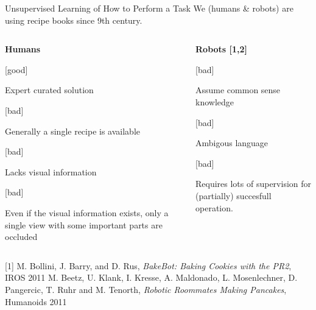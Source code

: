 {
\begin{frame}[c]%
\phantom{title page}
 \titlepage
\end{frame}
\addtocounter{framenumber}{-1}

}


\begin{frame}{Unsupervised Learning of How to Perform a Task}
  We (humans \& robots) are using recipe books since 9th century.
\begin{columns}
  \begin{column}[T]{5.5cm}
    \centering
    {\bf Humans}
    \begin{itemize}
      	{[good]
        \item Expert curated solution}
        {[bad]
        \item Generally a single recipe is available}
        {[bad]
        \item Lacks visual information}
        {[bad]
        \item Even if the visual information exists, only a single view with some important parts are occluded}
    \end{itemize}
  \end{column}
  \begin{column}[T]{5.5cm}
    \centering
    {\bf Robots [1,2]}
    \begin{itemize}
{[bad]
\item Assume common sense knowledge}
{[bad]
\item Ambigous language}
{[bad]
\item Requires lots of supervision for (partially) succesfull operation.}
    \end{itemize}
  \end{column}

\end{columns}
\vfill
\tiny
[1] M. Bollini, J. Barry, and D. Rus, \emph{BakeBot: Baking Cookies with the PR2}, IROS 2011 \newline
[2] M. Beetz, U. Klank, I. Kresse, A. Maldonado, L. Mosenlechner, D. Pangercic, T. Ruhr and M. Tenorth, \emph{Robotic Roommates Making Pancakes}, Humanoids 2011
\normal
\end{frame}

